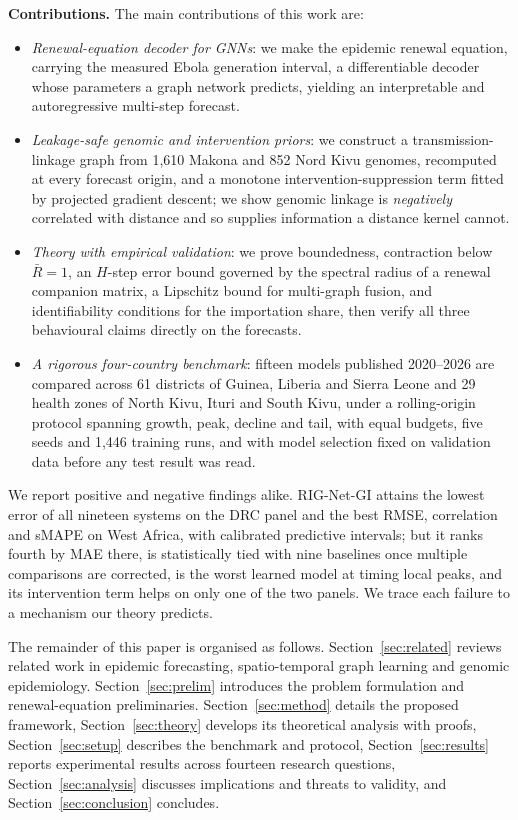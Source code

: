 \documentclass[conference]{IEEEtran}
\begin{document}
\textbf{Contributions.} The main contributions of this work are:
\begin{itemize}
    \item \textit{Renewal-equation decoder for GNNs}: we make the epidemic renewal equation, carrying the measured Ebola generation interval, a differentiable decoder whose parameters a graph network predicts, yielding an interpretable and autoregressive multi-step forecast.
    \item \textit{Leakage-safe genomic and intervention priors}: we construct a transmission-linkage graph from 1{,}610 Makona and 852 Nord Kivu genomes, recomputed at every forecast origin, and a monotone intervention-suppression term fitted by projected gradient descent; we show genomic linkage is \emph{negatively} correlated with distance and so supplies information a distance kernel cannot.
    \item \textit{Theory with empirical validation}: we prove boundedness, contraction below $\bar R=1$, an $H$-step error bound governed by the spectral radius of a renewal companion matrix, a Lipschitz bound for multi-graph fusion, and identifiability conditions for the importation share, then verify all three behavioural claims directly on the forecasts.
    \item \textit{A rigorous four-country benchmark}: fifteen models published 2020--2026 are compared across 61 districts of Guinea, Liberia and Sierra Leone and 29 health zones of North Kivu, Ituri and South Kivu, under a rolling-origin protocol spanning growth, peak, decline and tail, with equal budgets, five seeds and 1{,}446 training runs, and with model selection fixed on validation data before any test result was read.
\end{itemize}

We report positive and negative findings alike. RIG-Net-GI attains the lowest error of all nineteen systems on the DRC panel and the best RMSE, correlation and sMAPE on West Africa, with calibrated predictive intervals; but it ranks fourth by MAE there, is statistically tied with nine baselines once multiple comparisons are corrected, is the worst learned model at timing local peaks, and its intervention term helps on only one of the two panels. We trace each failure to a mechanism our theory predicts.

The remainder of this paper is organised as follows. Section~\ref{sec:related} reviews related work in epidemic forecasting, spatio-temporal graph learning and genomic epidemiology. Section~\ref{sec:prelim} introduces the problem formulation and renewal-equation preliminaries. Section~\ref{sec:method} details the proposed framework, Section~\ref{sec:theory} develops its theoretical analysis with proofs, Section~\ref{sec:setup} describes the benchmark and protocol, Section~\ref{sec:results} reports experimental results across fourteen research questions, Section~\ref{sec:analysis} discusses implications and threats to validity, and Section~\ref{sec:conclusion} concludes.
\end{document}
